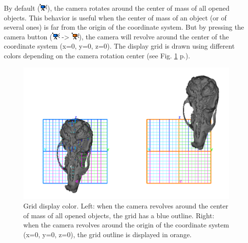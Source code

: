 \documentclass[12pt, a4paper]{book}
\begin{document}
By default (\includegraphics[scale=0.7]{../images/06/camera/move_cam2.png}), the camera rotates around the center of mass of all opened objects. This behavior is useful when the center of mass of an object (or of several ones) is far from the origin of the coordinate system. But by pressing the camera button (\includegraphics[scale=0.7]{../images/06/camera/move_cam2.png} -> \includegraphics[scale=0.7]{../images/06/camera/move_cam.png}), the camera will revolve around the center of the coordinate system (x=0, y=0, z=0).  The display grid is drawn using different colors depending on the camera rotation center (see Fig. \ref{grid_color} p.\pageref{grid_color}).

\begin{figure}
  \centering
  \includegraphics[scale=0.4]{grid.png} 
	\caption{Grid display color.  Left: when the camera revolves around the center of mass of all opened objects, the grid has a blue outline. Right: when the camera revolves around the origin of the coordinate system (x=0, y=0, z=0), the grid outline is displayed in orange.}
\label{grid_color}
 
\end{figure}
\end{document}
